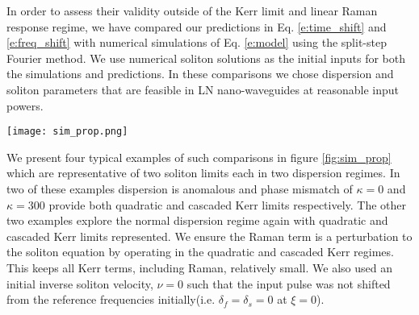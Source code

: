 \documentclass[reprint,
 amsmath,amssymb,
 pra,
]{revtex4-1}
\begin{document}
In order to assess their validity outside of the Kerr limit and linear Raman response regime, we have compared our predictions in Eq. \eqref{e:time_shift} and \eqref{e:freq_shift} with numerical simulations of Eq. \eqref{e:model} using the split-step Fourier method. We use numerical soliton solutions as the initial inputs for both the simulations and predictions. In these comparisons we chose dispersion and soliton parameters that are feasible in LN nano-waveguides at reasonable input powers.
\begin{figure*}
    \centering
    \texttt{[image: sim\_prop.png]}
    \caption{ Simulated soliton propagation in time and frequency domains shown in the upper and lower plots in each panel respectively. The FF and SH are shown on the right and left sides of each panel respectively. Dashed lines show time and frequency shifts predicted by Eq. \eqref{e:time_shift} and \eqref{e:freq_shift}. Insets show the relative input soliton power plotted in the time domain for FF (solid red) and SH (dashed blue). Panels (a) and (b) show solitons in the quadratic limit with anomalous and normal dispersion respectively. Panels (c) and (d) show solitons in the cascaded Kerr limit with anomalous and normal dispersion respectively. Parameters used in each panel are: (a) $\mu=5$, $\nu=0$, $\kappa=0$, $s_1=0$, $r_2=1$, $s_2=1/4$. (b) $\mu=-5$, $\nu=0$, $\kappa=0$, $s_1=0$, $r_2=-1$, $s_2=-1/4$. (c) $\mu=2$, $\nu=0$, $\kappa=-1000$, $s_1=10$, $r_2=1$, $s_2=1/4$. (d) $\mu=-2$, $\nu=0$, $\kappa=300$, $s_1=0$, $r_2=-1$, $s_2=-1/4$. For all of these simulations we used an input FF wavelength of $1500 \rm{nm}$ ( $\omega_f = 200\rm{THz}$), characteristic time scale, $t_0 = 100\rm{fs}$ and $\alpha_f = 0.0007$, $\alpha_s=0.008$, $\alpha_c=0.005$.
    }
    \label{fig:sim_prop}
\end{figure*}

We present four typical examples of such comparisons in figure \ref{fig:sim_prop} which are representative of two soliton limits each in two dispersion regimes. In two of these examples dispersion is anomalous and phase mismatch of $\kappa =0$ and $\kappa = 300$ provide both quadratic and cascaded Kerr limits respectively. The other two examples explore the normal dispersion regime again with quadratic and cascaded Kerr limits represented. We ensure the Raman term is a perturbation to the soliton equation by operating in the quadratic and cascaded Kerr regimes. This keeps all Kerr terms, including Raman, relatively small. We also used an initial inverse soliton velocity, $\nu=0$ such that the input pulse was not shifted from the reference frequencies initially(i.e. $\delta_f=\delta_s = 0$ at $\xi=0$).
\end{document}
